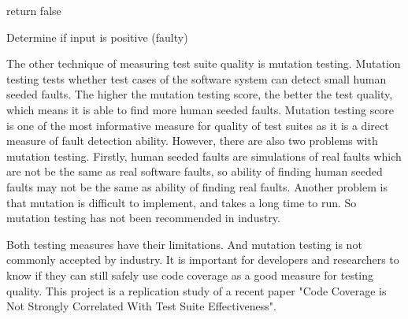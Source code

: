 \begin{algorithm}[t]
	{
		return false\;
	}
	\caption{Determine if input is positive (faulty)}
	\label{algo:faultygreater}
	\bigskip
\end{algorithm}

The other technique of measuring test suite quality is mutation testing. Mutation testing tests whether test cases of the software system can detect small human seeded faults. The higher the mutation testing score, the better the test quality, which means it is able to find more human seeded faults. Mutation testing score is one of the most informative measure for quality of test suites as it is a direct measure of fault detection ability. However, there are also two problems with mutation testing. Firstly, human seeded faults are simulations of real faults which are not be the same as real software faults, so ability of finding human seeded faults may not be the same as ability of finding real faults. Another problem is that mutation is difficult to implement, and takes a long time to run. So mutation testing has not been recommended in industry. 

Both testing measures have their limitations. And mutation testing is not commonly accepted by industry. It is important for developers and researchers to know if they can still safely use code coverage as a good measure for testing quality. This project is a replication study of a recent paper "Code Coverage is Not Strongly Correlated With Test Suite Effectiveness".